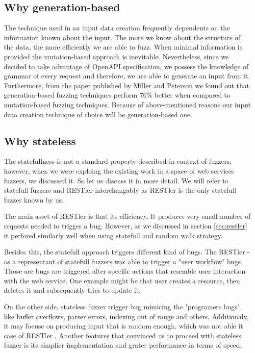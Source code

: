 \subsection{Why generation-based}
The technique used in an input data creation frequently dependents on the information known about the input. The more we know about the structure of the data, the more efficiently we are able to fuzz. When minimal information is provided the mutation-based approach is inevitable. Nevertheless, since we decided to take advantage of OpenAPI specification, we possess the knowledge of grammar of every request and therefore, we are able to generate an input from it. Furthermore, from the paper published by Miller and Peterson we found out that generation-based fuzzing techniques perform 76\% better when compared to mutation-based fuzzing techniques\cite{miller2007analysis}. Because of above-mentioned reasons our input data creation technique of choice will be generation-based one.

\subsection{Why stateless}
The statefullness is not a standard property described in context of fuzzers, however, when we were exploing the existing work in a space of web services fuzzers, we discussed it. So let us discuss it in more detail. We will refer to statefull fuzzers and RESTler interchangably as RESTler is the only statefull fuzzer known by us.

The main asset of RESTler is that its efficiency. It produces very small number of requests needed to trigger a bug. However, as we discussed in section \ref{sec:restler} it perfored similarly well when using statefull and random walk strategy.

Besides this, the statefull approach triggers different kind of bugs. The RESTler - as a representant of statefull fuzzers was able to trigger a "user workflow" bugs. Those are bugs are triggered after specific actions that resemble user interaction with the web service. One example might be that user creates a resource, then deletes it and subsequently tries to update it.

On the other side, stateless fuzzer trigger bug mimicing the "programers bugs", like buffer overflows, parser errors, indexing out of range and others. Additionaly, it may focuse on producing input that is random enough, which was not able it case of RESTler \cite{atlidakis2019restler}. Another features that convinced us to proceed with stateless fuzzer is its simplier implementation and grater performance in terms of speed.

